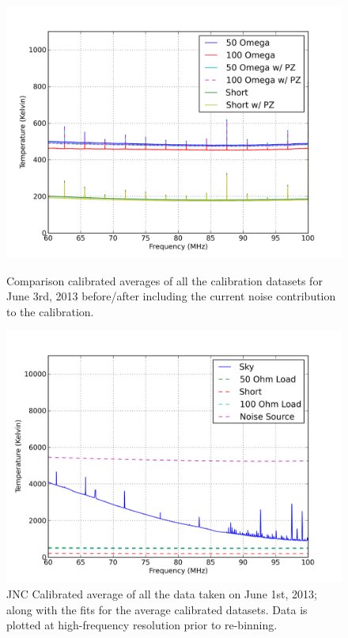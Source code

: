\begin{figure}[htb]
\centering
\begin{minipage}[b]{0.48\textwidth}
\centering
\includegraphics[width=0.95\linewidth]{Data_analysis/figures/June_03_comp_test.png}
\caption{Comparison calibrated averages of all the calibration datasets for June 3rd, 2013 before/after including the current noise contribution to the calibration. }
\label{Fig:avg_cal_comp}
\end{minipage}%
\begin{minipage}[b]{0.02\textwidth}
\hspace{1cm}
\end{minipage}%
\begin{minipage}[b]{0.48\textwidth}
\centering
\includegraphics[width=0.95\linewidth]{Data_analysis/figures/June_01_mean_JNCcal_spectrum_full_ref.png}
\caption{JNC Calibrated average of all the data taken on June 1st, 2013; along with the fits for the average calibrated datasets. Data is plotted at high-frequency resolution prior to re-binning. }
\label{Fig:avg_JNCcal_data}
\end{minipage}
\end{figure}

